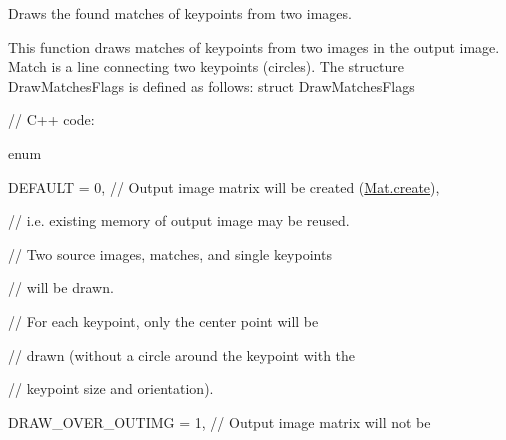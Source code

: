 Draws the found matches of keypoints from two images.

This function draws matches of keypoints from two images in the output image. Match is a line connecting two keypoints (circles). The structure {\ttfamily Draw\+Matches\+Flags} is defined as follows\+: struct Draw\+Matches\+Flags {\ttfamily }

{\ttfamily }

{\ttfamily }

{\ttfamily // C++ code\+:}

{\ttfamily }

{\ttfamily }

{\ttfamily enum}

{\ttfamily }

{\ttfamily }

{\ttfamily D\+E\+F\+A\+U\+LT = 0, // Output image matrix will be created (\mbox{\hyperlink{classorg_1_1opencv_1_1core_1_1_mat_a539b0a3690afb6b43047b50cbb787fee}{Mat.\+create}}),}

{\ttfamily }

{\ttfamily }

{\ttfamily // i.\+e. existing memory of output image may be reused.}

{\ttfamily }

{\ttfamily }

{\ttfamily // Two source images, matches, and single keypoints}

{\ttfamily }

{\ttfamily }

{\ttfamily // will be drawn.}

{\ttfamily }

{\ttfamily }

{\ttfamily // For each keypoint, only the center point will be}

{\ttfamily }

{\ttfamily }

{\ttfamily // drawn (without a circle around the keypoint with the}

{\ttfamily }

{\ttfamily }

{\ttfamily // keypoint size and orientation).}

{\ttfamily }

{\ttfamily }

{\ttfamily D\+R\+A\+W\+\_\+\+O\+V\+E\+R\+\_\+\+O\+U\+T\+I\+MG = 1, // Output image matrix will not be}

{\ttfamily }

{\ttfamily }

